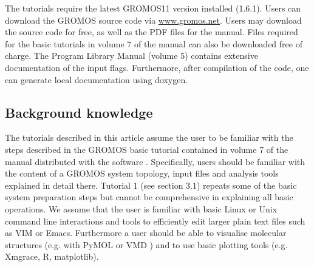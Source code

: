 The tutorials require the latest GROMOS11 version installed (1.6.1). 
Users can download the GROMOS source code via \url{www.gromos.net}.  Users may download the source code for free, as well as the PDF files for the manual. Files required for the basic tutorials in volume 7 of the manual can also be downloaded free of charge.
The Program Library Manual (volume 5) \cite{volume_5} 
contains extensive documentation of the input flags. Furthermore, after compilation of the code, one can generate local documentation using doxygen.


\subsection{Background knowledge}
%
The tutorials described in this article assume the user to be familiar with the steps described in the GROMOS basic tutorial contained in volume 7 of the manual distributed with the software \cite{volume_7}. 
Specifically, users should be familiar with the content of a GROMOS system topology, input files and analysis tools explained in detail there.
Tutorial 1 (see section 3.1) repeats some of the basic system preparation steps but cannot be comprehensive in explaining all basic operations. We assume that the user is familiar with basic Linux or Unix 
command line interactions and tools to efficiently edit larger plain text files such as VIM or Emacs. Furthermore a user should be able to visualise molecular structures (e.g. with PyMOL \cite{pymol} or VMD \cite{HUMP96}) 
and to use basic plotting tools (e.g. Xmgrace, R, matplotlib).  

